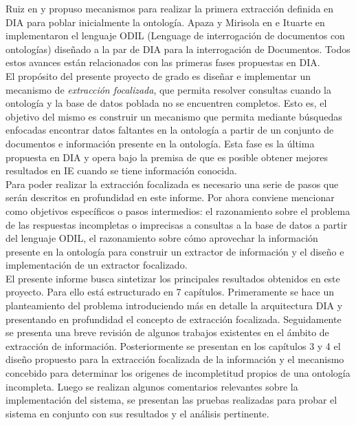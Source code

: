 Ruiz en \cite{ruiz-HMM} y \cite{SemistructuredTextExtraction} propuso mecanismos para realizar la primera extracción definida en DIA para poblar inicialmente la ontología. Apaza y Mirisola en \cite{ODILImplementation} e Ituarte en \cite{ODILImplementationDefinition} implementaron el lenguaje ODIL (Lenguage de interrogación de documentos con ontologías) diseñado a la par de DIA para la interrogación de Documentos. Todos estos avances están relacionados con las primeras fases propuestas en DIA.  \\

El propósito del presente proyecto de grado es diseñar e implementar un mecanismo de \emph{extracción focalizada}, que permita resolver consultas cuando la ontología y la base de datos poblada no se encuentren completos. Esto es, el objetivo del mismo es construir un mecanismo que permita mediante búsquedas enfocadas encontrar datos faltantes en la ontología a partir de un conjunto de documentos e información presente en la ontología. Esta fase es la última propuesta en DIA y opera bajo la premisa de que es posible obtener mejores resultados en IE cuando se tiene información conocida. \\

Para poder realizar la extracción focalizada es necesario una serie de pasos que serán descritos en profundidad en este informe. Por ahora conviene mencionar como objetivos específicos o pasos intermedios: el razonamiento sobre el problema de las respuestas incompletas o imprecisas a consultas a la base de datos a partir del lenguaje ODIL, el razonamiento sobre cómo aprovechar la información presente en la ontología para construir un extractor de información y el diseño e implementación de un extractor focalizado. \\

El presente informe busca sintetizar los principales resultados obtenidos en este proyecto. Para ello está estructurado en 7 capítulos. Primeramente se hace un planteamiento del problema introduciendo más en detalle la arquitectura DIA y presentando en profundidad el concepto de extracción focalizada. Seguidamente se presenta una breve revisión de algunos trabajos existentes en el ámbito de extracción de información. Posteriormente se presentan en los capítulos 3 y 4 el diseño propuesto para la extracción focalizada de la información y el mecanismo concebido para determinar los origenes de incompletitud propios de una ontología incompleta. Luego se realizan algunos comentarios relevantes sobre la implementación del sistema, se presentan las pruebas realizadas para probar el sistema en conjunto con sus resultados y el análisis pertinente. \\
